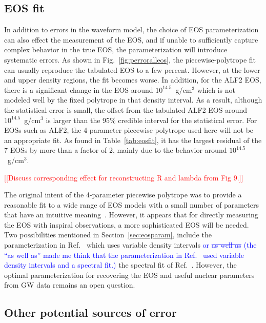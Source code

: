 \documentclass[twocolumn,prd,amssymb,aps,nofootinbib,showpacs,epsf]{revtex4}
\newcommand{\red}{\textcolor{red}}
\newcommand\les[2]{\textcolor{blue}{{#1}\sout{#2}}}
\begin{document}
\subsection{EOS fit}
\label{sec:systematicEOS}

In addition to errors in the waveform model, the choice of EOS parameterization can also effect the measurement of the EOS, and if unable to sufficiently capture complex behavior in the true EOS, the parameterization will introduce systematic errors. As shown in Fig.~\ref{fig:perroralleos}, the piecewise-polytrope fit can usually reproduce the tabulated EOS to a few percent. However, at the lower and upper density regions, the fit becomes worse. In addition, for the ALF2 EOS, there is a significant change in the EOS around $10^{14.5}$~g/cm$^3$ which is not modeled well by the fixed polytrope in that density interval. As a result, although the statistical error is small, the offset from the tabulated ALF2 EOS around $10^{14.5}$~g/cm$^3$ is larger than the 95\% credible interval for the statistical error. For EOSs such as ALF2, the 4-parameter piecewise polytrope used here will not be an appropriate fit. As found in Table~\ref{tab:eosfit}, it has the largest residual of the 7 EOSs by more than a factor of 2, mainly due to the behavior around $10^{14.5}$~g/cm$^3$. 

\red{[[Discuss corresponding effect for reconstructing R and lambda from Fig 9.]]}

The original intent of the 4-parameter piecewise polytrope was to provide a reasonable fit to a wide range of EOS models with a small number of parameters that have an intuitive meaning~\cite{ReadLackey2009}. However, it appears that for directly measuring the EOS with inspiral observations, a more sophisticated EOS will be needed. Two possibilities mentioned in Section~\ref{sec:eosparam}, include the parameterization in Ref.~\cite{SteinerLattimerBrown2010} which uses variable density intervals \les{or }{as well as} \les{(the ``as well as'' made me think that the parameterization in Ref.~\cite{SteinerLattimerBrown2010} used variable density intervals and a spectral fit.)}{} the spectral fit of Ref.~\cite{Lindblom2010}. However, the optimal parameterization for recovering the EOS and useful nuclear parameters from GW data remains an open question.

\subsection{Other potential sources of error}
\end{document}
